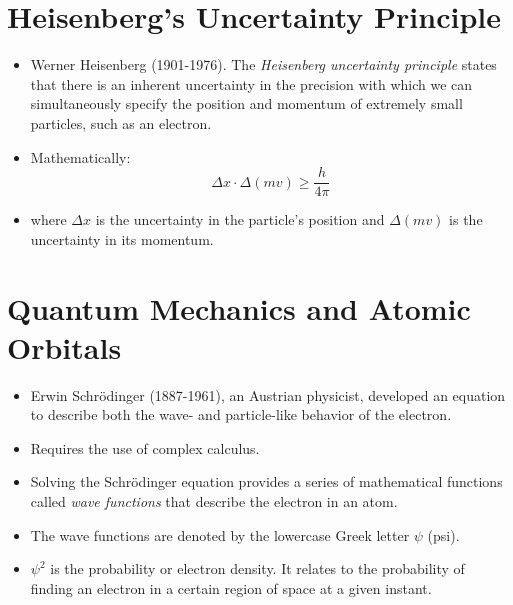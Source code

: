 \documentclass[
	chapter=7,
	title={Quantum Theory {\&} the Electronic Structure of Atoms},
	showanswers=true,
]{chem122notes}
\begin{document}
\section{Heisenberg's Uncertainty Principle}\label{sec:heisenberg's-uncertainty-principle}
\begin{itemize}
	\item Werner Heisenberg (1901-1976).
	The \emph{Heisenberg uncertainty principle} states that there is an inherent uncertainty in the precision with which we can simultaneously specify the position and momentum of extremely small particles, such as an electron.
	\item Mathematically:
	\begin{equation}
		\Delta x \cdot \Delta (mv) \geq \frac{h}{4\pi}
		\label{eq:heisenberg-uncertainty-principle}
	\end{equation}
	\item where $\Delta x$ is the uncertainty in the particle's position and $\Delta (mv)$ is the uncertainty in its momentum.
\end{itemize}

\section{Quantum Mechanics and Atomic Orbitals}\label{sec:quantum-mechanics-and-atomic-orbitals}
\begin{itemize}
	\item Erwin Schr{\"o}dinger (1887-1961), an Austrian physicist, developed an equation to describe both the wave- and particle-like behavior of the electron.
	\item Requires the use of complex calculus.
	\item Solving the Schr{\"o}dinger equation provides a series of mathematical functions called \emph{wave functions} that describe the electron in an atom.
	\item The wave functions are denoted by the lowercase Greek letter \emph{$\psi$} (psi).
	\item \emph{$\psi^{2}$} is the probability or electron density.
	It relates to the probability of finding an electron in a certain region of space at a given instant.
\end{itemize}
\end{document}
